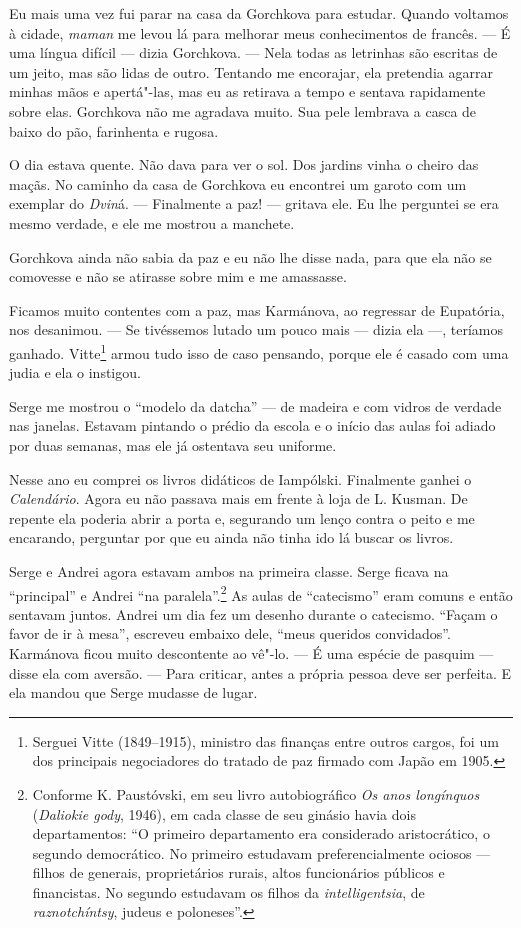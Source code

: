 Eu mais uma vez fui parar na casa da Gorchkova para estudar. Quando
voltamos à cidade, \emph{maman} me levou lá para melhorar meus
conhecimentos de francês. --- É uma língua difícil --- dizia Gorchkova.
--- Nela todas as letrinhas são escritas de um jeito, mas são lidas de
outro. Tentando me encorajar, ela pretendia agarrar minhas mãos e
apertá"-las, mas eu as retirava a tempo e sentava rapidamente sobre elas.
Gorchkova não me agradava muito. Sua pele lembrava a casca de baixo do
pão, farinhenta e rugosa.

O dia estava quente. Não dava para ver o sol. Dos jardins vinha o cheiro
das maçãs. No caminho da casa de Gorchkova eu encontrei um garoto com um
exemplar do \emph{Dvin}á. --- Finalmente a paz! --- gritava ele. Eu lhe
perguntei se era mesmo verdade, e ele me mostrou a manchete.

Gorchkova ainda não sabia da paz e eu não lhe disse nada, para que ela
não se comovesse e não se atirasse sobre mim e me amassasse.

Ficamos muito contentes com a paz, mas Karmánova, ao regressar de
Eupatória, nos desanimou. --- Se tivéssemos lutado um pouco mais ---
dizia ela ---, teríamos ganhado. Vitte\footnote{Serguei Vitte
  (1849--1915), ministro das finanças entre outros cargos, foi um dos
  principais negociadores do tratado de paz firmado com Japão em 1905.}
armou tudo isso de caso pensando, porque ele é casado com uma judia e
ela o instigou.

Serge me mostrou o ``modelo da datcha'' --- de madeira e com vidros de
verdade nas janelas. Estavam pintando o prédio da escola e o início das
aulas foi adiado por duas semanas, mas ele já ostentava seu uniforme.

Nesse ano eu comprei os livros didáticos de Iampólski. Finalmente ganhei
o \emph{Calendário}. Agora eu não passava mais em frente à loja de L.
Kusman. De repente ela poderia abrir a porta e, segurando um lenço
contra o peito e me encarando, perguntar por que eu ainda não tinha ido
lá buscar os livros.

Serge e Andrei agora estavam ambos na primeira classe. Serge ficava na
``principal'' e Andrei ``na paralela''.\footnote{Conforme K. Paustóvski,
  em seu livro autobiográfico \emph{Os anos longínquos} (\emph{Daliokie
  gody}, 1946), em cada classe de seu ginásio havia dois departamentos:
  ``O primeiro departamento era considerado aristocrático, o segundo
  democrático. No primeiro estudavam preferencialmente ociosos ---
  filhos de generais, proprietários rurais, altos funcionários públicos
  e financistas. No segundo estudavam os filhos da
  \emph{intelligentsia}, de \emph{raznotchíntsy}, judeus e poloneses''.}
As aulas de ``catecismo'' eram comuns e então sentavam juntos. Andrei um
dia fez um desenho durante o catecismo. ``Façam o favor de ir à mesa'',
escreveu embaixo dele, ``meus queridos convidados''. Karmánova ficou
muito descontente ao vê"-lo. --- É uma espécie de pasquim --- disse ela
com aversão. --- Para criticar, antes a própria pessoa deve ser
perfeita. E ela mandou que Serge mudasse de lugar.

